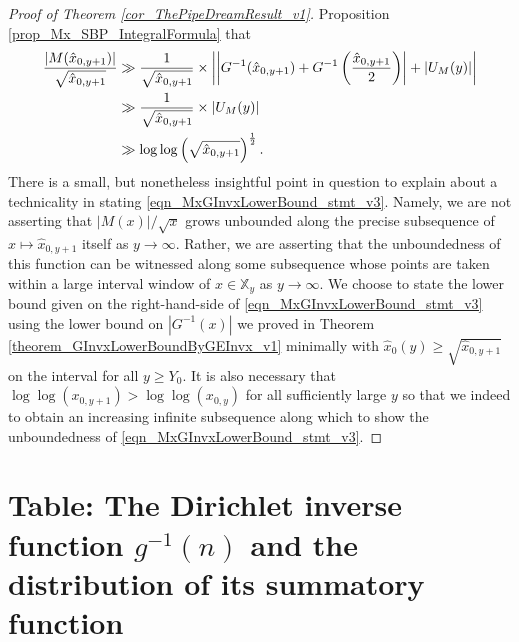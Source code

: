 \documentclass[11pt,reqno,a4letter]{article}
\numberwithin{figure}{section}
\numberwithin{table}{section}
\theoremstyle{plain}
\numberwithin{theorem}{section}
\theoremstyle{definition}
\begin{document}
\begin{proof}[Proof of Theorem \ref{cor_ThePipeDreamResult_v1}]
Proposition \ref{prop_Mx_SBP_IntegralFormula} that 
\begin{align} 
\notag 
\frac{|M(\hat{x}_{0,y+1})|}{\sqrt{\hat{x}_{0,y+1}}} & \gg \frac{1}{\sqrt{\hat{x}_{0,y+1}}} \times 
     \left\lvert \left\lvert 
     G^{-1}(\hat{x}_{0,y+1}) + G^{-1}\left(\frac{\hat{x}_{0,y+1}}{2}\right) \right\rvert + 
     \left\lvert U_M(y) \right\rvert \right\rvert \\ 
\notag 
     & \gg \frac{1}{\sqrt{\hat{x}_{0,y+1}}} \times \left\lvert U_M(y) \right\rvert \\ 
\label{eqn_MxGInvxLowerBound_stmt_v3} 
     & \gg \log\log\left(\sqrt{\hat{x}_{0,y+1}}\right)^{\frac{1}{2}}. 
\end{align} 
There is a small, but nonetheless insightful point in question 
to explain about a 
technicality in stating \eqref{eqn_MxGInvxLowerBound_stmt_v3}. 
Namely, we are not asserting that 
$|M(x)| / \sqrt{x}$ grows unbounded along the precise subsequence of 
$x \mapsto \hat{x}_{0,y+1}$ itself as $y \rightarrow \infty$. 
Rather, we are asserting that the unboundedness of this function 
can be witnessed along some subsequence whose points are taken within a 
large interval window of 
$x \in \mathbb{X}_y$ as 
$y \rightarrow \infty$. 
We choose to state the lower bound given on the right-hand-side of 
\eqref{eqn_MxGInvxLowerBound_stmt_v3} using the 
lower bound on $|G^{-1}(x)|$ we proved in 
Theorem \ref{theorem_GInvxLowerBoundByGEInvx_v1} 
minimally with $\hat{x}_0(y) \geq \sqrt{\hat{x}_{0,y+1}}$ on the interval 
for all $y \geq Y_0$. 
It is also necessary that $\log\log(x_{0,y+1}) > \log\log(x_{0,y})$ 
for all sufficiently large $y$ so that we indeed to obtain an increasing infinite 
subsequence along which to show the unboundedness of 
\eqref{eqn_MxGInvxLowerBound_stmt_v3}. 
\end{proof} 

\newpage 
\renewcommand{\refname}{References} 
{}


\newpage
\setcounter{section}{0} 
\renewcommand{\thesection}{T.\arabic{section}} 

\section{Table: The Dirichlet inverse function $g^{-1}(n)$ and the 
         distribution of its summatory function} 
\label{table_conjecture_Mertens_ginvSeq_approx_values}
\end{document}
